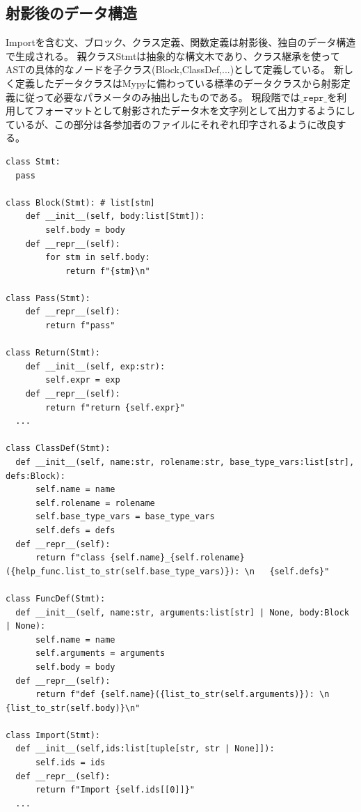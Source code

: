 \documentclass{thesis}
\begin{document}
\subsection{射影後のデータ構造}
Importを含む文、ブロック、クラス定義、関数定義は射影後、独自のデータ構造で生成される。
親クラス\textsf{Stmt}は抽象的な構文木であり、クラス継承を使ってASTの具体的なノードを子クラス(\textsf{Block,ClassDef,...})として定義している。
新しく定義したデータクラスはMypyに備わっている標準のデータクラスから射影定義に従って必要なパラメータのみ抽出したものである。
現段階では$\texttt{\_repr\_}$を利用してフォーマットとして射影されたデータ木を文字列として出力するようにしているが、この部分は各参加者のファイルにそれぞれ印字されるように改良する。
\begin{lstlisting}[caption=projection\_all.py,label=data]
class Stmt:
  pass
  
class Block(Stmt): # list[stm]
    def __init__(self, body:list[Stmt]):
        self.body = body
    def __repr__(self):
        for stm in self.body:
            return f"{stm}\n"
  
class Pass(Stmt):
    def __repr__(self):
        return f"pass"
  
class Return(Stmt):
    def __init__(self, exp:str):
        self.expr = exp
    def __repr__(self):
        return f"return {self.expr}"
  ... 

class ClassDef(Stmt):
  def __init__(self, name:str, rolename:str, base_type_vars:list[str], defs:Block):
      self.name = name
      self.rolename = rolename
      self.base_type_vars = base_type_vars
      self.defs = defs
  def __repr__(self):
      return f"class {self.name}_{self.rolename}({help_func.list_to_str(self.base_type_vars)}): \n   {self.defs}"

class FuncDef(Stmt):
  def __init__(self, name:str, arguments:list[str] | None, body:Block | None):
      self.name = name
      self.arguments = arguments
      self.body = body
  def __repr__(self):
      return f"def {self.name}({list_to_str(self.arguments)}): \n      {list_to_str(self.body)}\n"
      
class Import(Stmt):
  def __init__(self,ids:list[tuple[str, str | None]]):
      self.ids = ids
  def __repr__(self):
      return f"Import {self.ids[[0]]}"
  ... 
\end{lstlisting}
\end{document}
